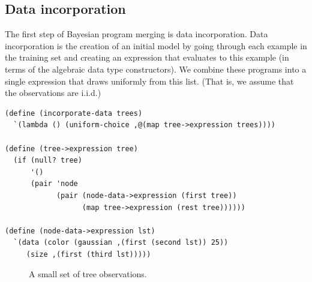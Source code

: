 \documentclass[a4paper,10pt]{article}
\begin{document}
\subsection{Data incorporation}
The first step of Bayesian program merging is data incorporation.  Data incorporation is the creation of an initial model by going through each example in the training set and creating an expression that evaluates to this example (in terms of the algebraic data type constructors).  We combine these programs into a single expression that draws uniformly from this list. (That is, we assume that the observations are i.i.d.) 
\begin{lstlisting}[frame=trblsingle]
(define (incorporate-data trees)
  `(lambda () (uniform-choice ,@(map tree->expression trees))))

(define (tree->expression tree)
  (if (null? tree)
      '()
      (pair 'node
            (pair (node-data->expression (first tree)) 
                  (map tree->expression (rest tree))))))

(define (node-data->expression lst)
  `(data (color (gaussian ,(first (second lst)) 25)) 
	 (size ,(first (third lst)))))
\end{lstlisting}

\begin{figure}[t]
  \subfloat{}
  \hspace{40pt} %
\caption{A small set of tree observations.}
\label{fig:tree-obs}
\end{figure}
\end{document}
